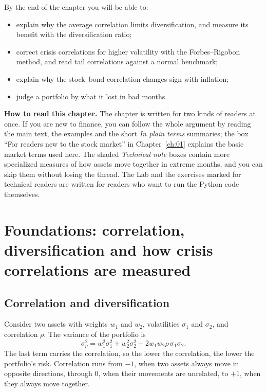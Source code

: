 By the end of the chapter you will be able to:

\begin{itemize}
  \item explain why the average correlation limits diversification, and measure its benefit with the diversification ratio;
  \item correct crisis correlations for higher volatility with the Forbes--Rigobon method, and read tail correlations against a normal benchmark;
  \item explain why the stock--bond correlation changes sign with inflation;
  \item judge a portfolio by what it lost in bad months.
\end{itemize}

\begin{callout}
\textbf{How to read this chapter.} The chapter is written for two kinds of readers at once. If you are new to finance, you can follow the whole argument by reading the main text, the examples and the short \emph{In plain terms} summaries; the box ``For readers new to the stock market'' in Chapter~\ref{ch:01} explains the basic market terms used here. The shaded \emph{Technical note} boxes contain more specialized measures of how assets move together in extreme months, and you can skip them without losing the thread. The Lab and the exercises marked for technical readers are written for readers who want to run the Python code themselves.
\end{callout}


\section{Foundations: correlation, diversification and how crisis correlations are measured}
\label{sec:13-foundations}

\subsection{Correlation and diversification}

Consider two assets with weights $w_1$ and $w_2$, volatilities $\sigma_1$ and $\sigma_2$, and correlation $\rho$. The variance of the portfolio is
\begin{equation}
  \sigma_p^2 = w_1^2\sigma_1^2 + w_2^2\sigma_2^2 + 2w_1w_2\rho\,\sigma_1\sigma_2.
  \label{eq:13-var2}
\end{equation}
The last term carries the correlation, so the lower the correlation, the lower the portfolio's risk. Correlation runs from $-1$, when two assets always move in opposite directions, through 0, when their movements are unrelated, to $+1$, when they always move together. 

